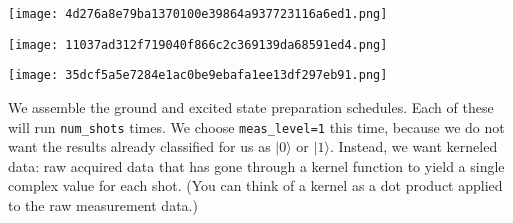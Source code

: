 \hypertarget{4aac5b01-78a6-454c-ac14-15c2fd9c1bf8}{}
\begin{Shaded}
\begin{Highlighting}[]
\OperatorTok{=}
\end{Highlighting}
\end{Shaded}

\texttt{[image: 4d276a8e79ba1370100e39864a937723116a6ed1.png]}

\hypertarget{13189420-2bd5-4ebb-a2b1-eecda68f8410}{}
\begin{Shaded}
\begin{Highlighting}[]
\OperatorTok{=}
\end{Highlighting}
\end{Shaded}

\texttt{[image: 11037ad312f719040f866c2c369139da68591ed4.png]}

\hypertarget{3d8a05ab-3dac-46b0-ad9a-f528a4c7ab84}{}
\begin{Shaded}
\begin{Highlighting}[]
\OperatorTok{=}
\end{Highlighting}
\end{Shaded}

\texttt{[image: 35dcf5a5e7284e1ac0be9ebafa1ee13df297eb91.png]}

\leavevmode{}%
We assemble the ground and excited state preparation schedules. Each of
these will run \texttt{num\_shots} times. We choose
\texttt{meas\_level=1} this time, because we do not want the results
already classified for us as \(|0\rangle\) or \(|1\rangle\). Instead, we
want kerneled data: raw acquired data that has gone through a kernel
function to yield a single complex value for each shot. (You can think
of a kernel as a dot product applied to the raw measurement data.)

\hypertarget{9ddcb126-e885-411a-99df-eb1e65cfb8b8}{}
\begin{Shaded}
\begin{Highlighting}[]
\OperatorTok{=} 

\OperatorTok{=}
\OperatorTok{=}\NormalTok{, }
\OperatorTok{=}\NormalTok{, }
\OperatorTok{=}

\end{Highlighting}
\end{Shaded}

